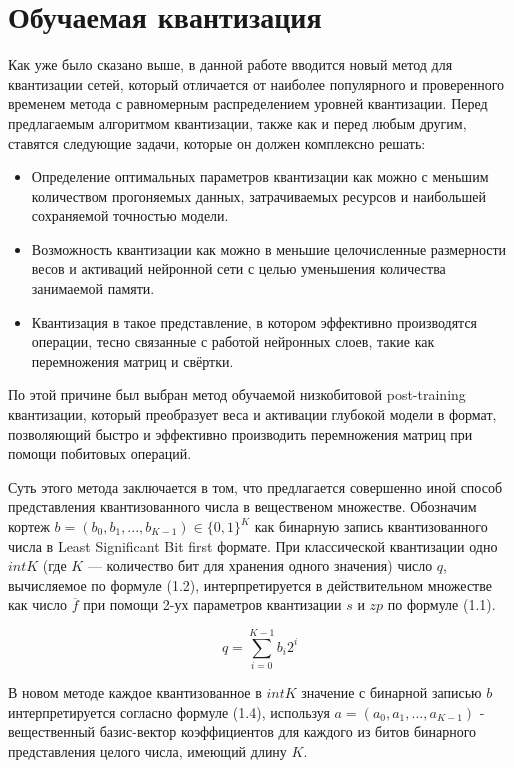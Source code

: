 \section{Обучаемая квантизация}

Как уже было сказано выше, в данной работе вводится новый метод для квантизации сетей, который отличается от наиболее популярного и проверенного временем метода с равномерным распределением уровней квантизации. Перед предлагаемым алгоритмом квантизации, также как и перед любым другим, ставятся следующие задачи, которые он должен комплексно решать:

\begin{itemize}
    \item Определение оптимальных параметров квантизации как можно с меньшим количеством прогоняемых данных, затрачиваемых ресурсов и наибольшей сохраняемой  точностью модели.
    \item Возможность квантизации как можно в меньшие целочисленные размерности весов и активаций нейронной сети с целью уменьшения количества занимаемой памяти.
    \item Квантизация в такое представление, в котором эффективно производятся операции, тесно связанные с работой нейронных слоев, такие как перемножения матриц и свёртки.
\end{itemize}

По этой причине был выбран метод обучаемой низкобитовой post-training квантизации, который преобразует веса и активации глубокой модели в формат, позволяющий быстро и эффективно производить перемножения матриц при помощи побитовых операций. 

Суть этого метода заключается в том, что предлагается совершенно иной способ представления квантизованного числа в вещественом множестве. Обозначим кортеж $b = (b_0, b_1, ..., b_{K - 1}) \in \{ 0, 1 \}^K$ как бинарную запись квантизованного числа в Least Significant Bit first формате.  При классической квантизации одно $intK$ (где $K$ — количество бит для хранения одного значения) число $q$, вычисляемое по формуле (1.2), интерпретируется в действительном множестве как число $\overline{f}$ при помощи 2-ух параметров квантизации $s$ и $zp$ по формуле (1.1).

\begin{equation}
q = \sum \limits_{i = 0}^{K - 1} b_i 2^i
\end{equation}

В новом методе каждое квантизованное в $intK$ значение с бинарной записью $b$ интерпретируется согласно формуле (1.4), используя $a = (a_0, a_1, ..., a_{K-1})$ - вещественный базис-вектор коэффициентов для каждого из битов бинарного представления целого числа, имеющий длину $K$.

